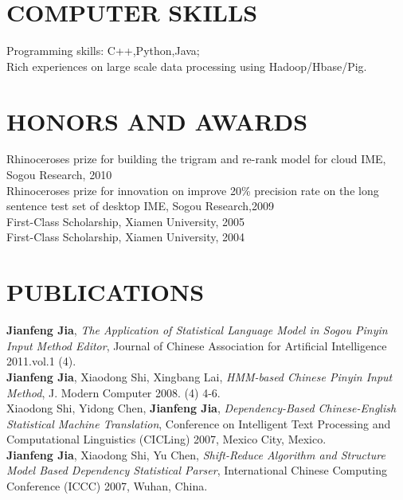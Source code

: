 \documentclass{res}
\begin{document}
\begin{resume}
\section{COMPUTER SKILLS}          
    Programming skills: C++,Python,Java;\\
    Rich experiences on large scale data processing using Hadoop/Hbase/Pig.
 
\section{HONORS AND AWARDS}             
     Rhinoceroses prize for building the trigram and re-rank model for cloud IME, Sogou Research, 2010 \\
     Rhinoceroses prize for innovation on improve 20\% precision rate on the long sentence test set of desktop IME, Sogou Research,2009 \\
     First-Class Scholarship, Xiamen University, 2005 \\
     First-Class Scholarship, Xiamen University, 2004 

\section{PUBLICATIONS}
     \textbf{Jianfeng Jia}, \emph{The Application of Statistical Language Model in Sogou Pinyin Input Method Editor}, Journal of Chinese Association for Artificial Intelligence 2011.vol.1 (4).\\
     \textbf{Jianfeng Jia}, Xiaodong Shi, Xingbang Lai, \emph{HMM-based Chinese Pinyin Input Method}, J. Modern Computer 2008. (4) 4-6.\\
     Xiaodong Shi, Yidong Chen, \textbf{Jianfeng Jia}, \emph{Dependency-Based Chinese-English Statistical Machine Translation}, Conference on Intelligent Text Processing and Computational Linguistics (CICLing) 2007, Mexico City, Mexico.\\
     \textbf{Jianfeng Jia}, Xiaodong Shi, Yu Chen, \emph{Shift-Reduce Algorithm and Structure Model Based Dependency Statistical Parser}, International Chinese Computing Conference (ICCC) 2007, Wuhan, China.



\end{resume}
\end{document}
